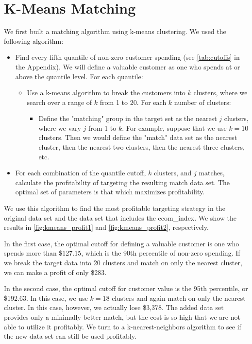\section{K-Means Matching}

We first built a matching algorithm using k-means clustering. We used the following algorithm:
\begin{itemize}
\item Find every fifth quantile of non-zero customer spending (see \cref{tab:cutoffs} in the Appendix). We will define a valuable customer as one who spends at or above the quantile level. For each quantile:
\begin{itemize}
\item Use a k-means algorithm to break the customers into $k$ clusters, where we search over a range of $k$ from 1 to 20. For each $k$ number of clusters:
\begin{itemize}
\item Define the "matching" group in the target set as the nearest $j$ clusters, where we vary $j$ from 1 to $k$. For example, suppose that we use $k=10$ clusters. Then we would define the "match" data set as the nearest cluster, then the nearest two clusters, then the nearest three clusters, etc.
\end{itemize}
\end{itemize}
\item For each combination of the quantile cutoff, $k$ clusters, and $j$ matches, calculate the profitability of targeting the resulting match data set. The optimal set of parameters is that which maximizes profitability.
\end{itemize}
We use this algorithm to find the most profitable targeting strategy in the original data set and the data set that includes the ecom\_index. We show the results in \cref{fig:kmeans_profit1} and \cref{fig:kmeans_profit2}, respectively.

In the first case, the optimal cutoff for defining a valuable customer is one who spends more than \$127.15, which is the 90th percentile of non-zero spending. If we break the target data into 20 clusters and match on only the nearest cluster, we can make a profit of only \$283.

In the second case, the optimal cutoff for customer value is the 95th percentile, or \$192.63. In this case, we use $k=18$ clusters and again match on only the nearest cluster. In this case, however, we actually lose \$3,378. The added data set provides only a minimally better match, but the cost is so high that we are not able to utilize it profitably. We turn to a k-nearest-neighbors algorithm to see if the new data set can still be used profitably.

